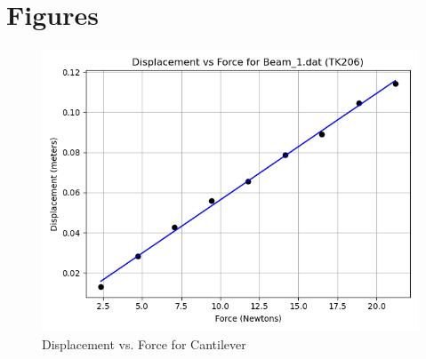 \documentclass{article}
\begin{document}
\section{Figures}
\begin{figure}[htb]
\begin{center}
\includegraphics[width=4.5in]{RunCanPlot.png}
\caption{Displacement vs. Force for Cantilever}
\end{center}
\end{figure}
\end{document}
